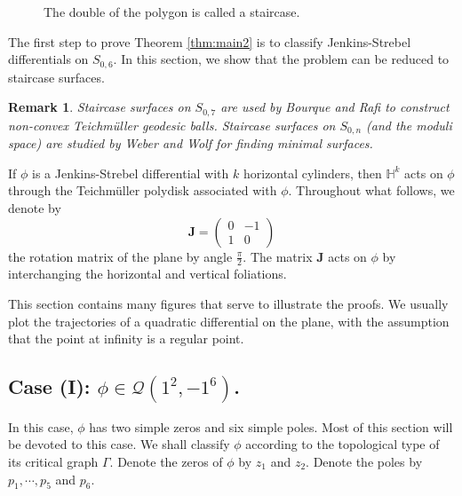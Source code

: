\documentclass[11pt]{amsart}
\theoremstyle{plain}
\newtheorem{Remark}{Remark}
\newcommand{\Q}{\mathcal{Q}}
\newcommand{\rot}{\mathbf{J}}
\begin{document}
\begin{figure}[h]\label{fig:staircase}
   \centering
    \caption{The double of the polygon is called a staircase.}
    \label{fig:staircase}
\end{figure}

The first step to prove Theorem \ref{thm:main2} is to classify Jenkins-Strebel differentials on $S_{0,6}$.  In this section, we show that the problem can be reduced to 
staircase surfaces.




\begin{Remark}
Staircase surfaces on $S_{0,7}$ are used by Bourque and Rafi \cite{BourqueRafi} to construct  non-convex Teichm\"uller geodesic balls. 
  Staircase surfaces on $S_{0,n}$ (and the moduli space) are studied by Weber and Wolf \cite{WW98} for finding minimal surfaces. 
\end{Remark}






If $\phi$ is a Jenkins-Strebel differential with $k$ horizontal cylinders, then 
 $\mathbb{H}^k$ acts on  $\phi$ through the Teichm\"uller polydisk associated with $\phi$. 
Throughout what follows, we denote by
$$\rot=\begin{pmatrix}
    0 & -1\\
    1 & 0
\end{pmatrix}$$
the rotation matrix of the plane by angle $\frac{\pi}{2}$. The matrix $\rot$ acts on $\phi$ by interchanging the horizontal and vertical foliations.

This section contains many figures that serve to illustrate the proofs. We usually plot the trajectories of a quadratic differential on the plane, with the assumption that the point at infinity is a regular point.


\subsection{Case (I): $\phi \in \Q(1^2, -1^6)$.}\label{Case-I}
In this case, $\phi$ has two simple zeros and six simple poles.  
Most of this section will be devoted to this case. 
We shall classify $\phi$ according to the topological type of its critical graph $\Gamma$.
Denote the zeros of $\phi$ by $z_1$ and $z_2$. Denote the poles by $p_1, \cdots, p_5$ and $p_6$. 
\end{document}

